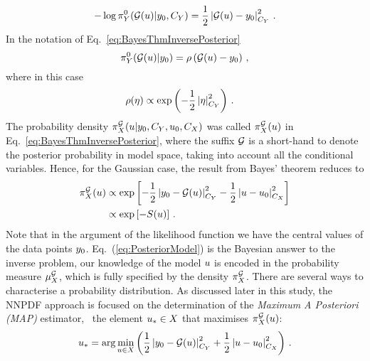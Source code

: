 \begin{equation}
  \label{eq:LikelyChiSq}
  -\log\pi_{Y}^0(\mathcal{G}(u)|y_0,C_{Y}) =  
      \frac12 \left|
      \mathcal{G}(u) - y_0
      \right|_{C_{Y}}^2
    \, .
\end{equation}
In the notation of Eq.~\ref{eq:BayesThmInversePosterior}
\begin{equation}
  \label{eq:IdentifyRho}
  \pi_{Y}^0(\mathcal{G}(u)|y_0) = \rho\left(
    \mathcal{G}(u) - y_0
  \right)\, ,
\end{equation}
where in this case 
\begin{align}
  \label{eq:RhoGauss}
  \rho(\eta) &\propto \exp\left(
               -\frac12 \left|\eta\right|_{C_{Y}}^2
               \right)\, .
\end{align}
The probability density $\pi^{\mathcal{G}}_{X}(u|y_0,
C_{Y},u_0,C_X)$ was called
$\pi_{X}^{\mathcal{G}}(u)$ in Eq.~\ref{eq:BayesThmInversePosterior}, where
the suffix $\mathcal{G}$ is a short-hand to denote the posterior probability in
model space, taking into account all the conditional variables. Hence, for the
Gaussian case, the result from Bayes' theorem reduces to
\begin{align}
  \label{eq:PosteriorModel}
  \pi_{X}^{\mathcal{G}}(u) 
  &\propto 
  \exp\left[
    -\frac12 \left| y_0 - \mathcal{G}(u) \right|_{C_{Y}} ^2
    -\frac12 \left| u - u_0 \right|_{C_X}^2
  \right] \\ 
  &\propto
  \exp\left[
    - S(u)
  \right]\, .
\end{align}
Note that in the argument of the likelihood function we have the central values
of the data points $y_0$. Eq.~(\ref{eq:PosteriorModel}) is the
Bayesian answer to the inverse problem, our knowledge of the model $u$
is encoded in the probability measure $\mu_{X}^{\mathcal{G}}$, which is fully
specified by the density $\pi_{X}^{\mathcal{G}}$. There are several ways to
characterise a probability distribution. As discussed later in this study, the
NNPDF approach is focused on the determination of the {\em Maximum A Posteriori
(MAP)} estimator, \ie\ the element $u_* \in X$ that maximises
$\pi_{X}^{\mathcal{G}}(u)$:
\begin{align}
  \label{eq:MAP}
  u_* = \arg\min_{u \in X} 
  \left(
    \frac12 \left| y_0 - \mathcal{G}(u) \right|_{C_{Y}}^2
    + \frac12 \left| u - u_0 \right|_{C_X}^2
  \right)\, .
\end{align}
